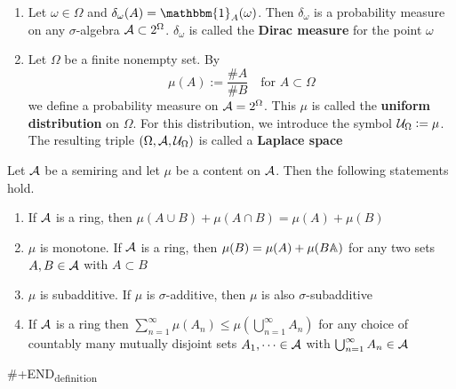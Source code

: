 \documentclass[11pt]{article}
\begin{document}
\begin{examplle}
\begin{enumerate}
\item Let \(\omega\in\Omega\) and \(\delta_\omega(A)=\mathbbm{1}_A(\omega)\). Then
\(\delta_\omega\) is a probability measure on any \(\sigma\)-algebra 
\(\mathcal{A}\subset2^\Omega\). \(\delta_\omega\) is called the \textbf{Dirac measure} for
the point \(\omega\)
\item Let \(\Omega\) be a finite nonempty set. By 
\begin{equation*}
\mu(A):=\frac{\#A}{\#B}\quad\text{for }A\subset\Omega
\end{equation*}
we define a probability measure on \(\mathcal{A}=2^\Omega\). This \(\mu\) is called the
\textbf{uniform distribution} on \(\Omega\). For this distribution, we introduce the symbol
\(\mathcal{U}_\Omega:=\mu\). The resulting triple \((\Omega,\mathcal{A},\mathcal{U}_\Omega)\) is
called a \textbf{Laplace space}
\end{enumerate}
\end{examplle}

\begin{lemma}
Let \(\mathcal{A}\) be a semiring and let \(\mu\) be a content on \(\mathcal{A}\). Then the
following statements hold.
\begin{enumerate}
\item If \(\mathcal{A}\) is a ring, then \(\mu(A\cup B)+\mu(A\cap B)=\mu(A)+\mu(B)\)
\item \(\mu\) is monotone. If \(\mathcal{A}\) is a ring, then \(\mu(B)=\mu(A)+\mu(B\mathbb{A})\) for
any two sets \(A,B\in\mathcal{A}\) with \(A\subset B\)
\item \(\mu\) is subadditive. If \(\mu\) is \(\sigma\)-additive, then \(\mu\) is also \(\sigma\)-subadditive
\item If \(\mathcal{A}\) is a ring then
\(\sum_{n=1}^\infty\mu(A_n)\le\mu(\bigcup_{n=1}^\infty A_n)\) for any
choice of countably many mutually disjoint sets \(A_1,\dots\in\mathcal{A}\) with 
\(\bigcup_{n=1}^\infty A_n\in\mathcal{A}\)
\end{enumerate}
\end{lemma}

\#+END\textsubscript{definition}
\end{document}

